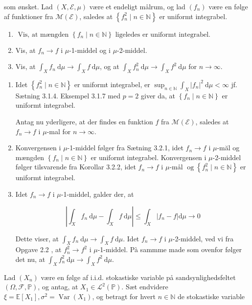 \documentclass{Class}
\begin{document}
som ønsket.
 Lad $(X, \mathcal{E}, \mu)$ være et endeligt målrum, og lad $\left(f_n\right)$ være en følge af funktioner fra $\mathcal{M}(\mathcal{E})$, saledes at $\left\{f_n^2 \mid n \in \mathbb{N}\right\}$ er uniformt integrabel.
\begin{enumerate}
    \item $\text { Vis, at mængden }\left\{f_n \mid n \in \mathbb{N}\right\} \text { ligeledes er uniformt integrabel. }$
    \item Vis, at $f_n\rightarrow f$ i $\mu$-1-middel og i $\mu$-2-middel.
    \item Vis, at $\int_X f_n \mathrm{~d} \mu \rightarrow \int_X f \mathrm{~d} \mu$, og at $\int_X f_n^2 \mathrm{~d} \mu \rightarrow \int_X f^2 \mathrm{~d} \mu$ for $n \rightarrow \infty$.
\end{enumerate}
\solution
\begin{enumerate}
    \item Idet $\left\{f_n^2 \mid n \in \mathbb{N}\right\}$ er uniformt integrabel, er $\sup _{n \in \mathbb{N}} \int_X\left|f_n\right|^2 \mathrm{~d} \mu<\infty$ jf. Sætning 3.1.4. Eksempel 3.1.7 med $p=2$ giver da, at $\left\{f_n \mid n \in \mathbb{N}\right\}$ er uniformt integrabel.

    Antag nu yderligere, at der findes en funktion $f$ fra $\mathcal{M}(\mathcal{E})$, saledes at $f_n \rightarrow f$ i $\mu$-mal for $n \rightarrow \infty$.
    \item Konvergensen i $\mu$-1-middel følger fra Sætning 3.2.1, idet $f_n \rightarrow f$ i $\mu$-măl og mængden $\left\{f_n \mid n \in \mathbb{N}\right\}$ er uniformt integrabel. Konvergensen i $\mu$-2-middel følger tilsvarende fra Korollar 3.2.2, idet $f_n \rightarrow f$ i $\mu$-mål $\operatorname{og}\left\{f_n^2 \mid n \in \mathbb{N}\right\}$ er uniformt integrabel.
    \item Idet $f_n \rightarrow f$ i $\mu$-1-middel, galder der, at

    $$
    \left|\int_X f_n \mathrm{~d} \mu-\int_X f \mathrm{~d} \mu\right| \leq \int_X\left|f_n-f\right| \mathrm{d} \mu \rightarrow 0
    $$
    
    
    Dette viser, at $\int_X f_n \mathrm{~d} \mu \rightarrow \int_X f \mathrm{~d} \mu$.
    Idet $f_n \rightarrow f$ i $\mu$-2-middel, ved vi fra Opgave 2.2 , at $f_n^2 \rightarrow f^2$ i $\mu$-1-middel. Pà sammme made som ovenfor følger det nu, at $\int_X f_n^2 \mathrm{~d} \mu \rightarrow \int_X f^2 \mathrm{~d} \mu$.
\end{enumerate}
Lad $\left(X_n\right)$ være en følge af i.i.d. stokastiske variable på sandsynlighedsfeltet $(\Omega, \mathcal{F}, \mathbb{P})$, og antag, at $X_1 \in \mathcal{L}^2(\mathbb{P})$. Sæt endvidere $\xi=\mathbb{E}\left[X_1\right], \sigma^2=\operatorname{Var}\left(X_1\right)$, og betragt for hvert $n \in \mathbb{N}$ de stokastiske variable
\end{document}
